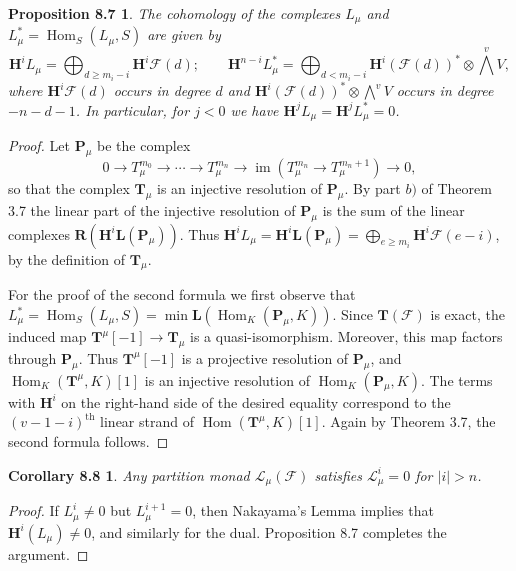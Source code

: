\documentclass{tran-l}
\newcommand{\myim}{\operatorname{im}}
\newcommand{\myHom}{\operatorname{Hom}}
\newcommand{\myth}{{\operatorname{th}}}
\newcommand{\F}{\mathcal{F}}
\newcommand{\myH}{\mathbf{H}}
\newcommand{\LL}{\mathbf{L}}
\newcommand{\myP}{\mathbf{P}}
\newcommand{\RR}{\mathbf{R}}
\newcommand{\TT}{\mathbf{T}}
\theoremstyle{plain}
\newtheorem*{theorem31}{Proposition 8.7}
\newtheorem*{theorem32}{Corollary 8.8}
\theoremstyle{remark}
\theoremstyle{definition}
\begin{document}
\begin{theorem31}
The cohomology of the complexes $L_{\mu }$ and
$L_{\mu }^{*}=\myHom _{S}(L_{\mu }, S)$ are given by
\begin{equation*}\myH ^{i}L_{\mu } = \bigoplus _{d\ge m_{i}-i} \myH ^{i} \F (d); \qquad \myH ^{n-i}L_{\mu }^{*} = 
\bigoplus _{d< m_{i}-i} \myH ^{i} (\F (d))^{*}\otimes \textstyle{\bigwedge ^{v}}V,
\end{equation*}
where $\myH ^{i} \F (d)$ occurs in degree $d$ and 
$\myH ^{i} (\F (d))^{*}\otimes \bigwedge ^{v}V$
occurs in  degree $-n-d-1$. In particular, for $j<0$ we
have $\myH ^{j}L_{\mu }= \myH ^{j}L_{\mu }^{*} = 0$.
\end{theorem31}
\begin{proof}  Let $\myP _{\mu }$ be the complex
\begin{equation*}0\to T_{\mu }^{m_{0}}\to \cdots \to T_{\mu }^{m_{n}}\to \myim (T_{\mu }^{m_{n}}\to T_{\mu }^{m_{n}+1})
\to 0,
\end{equation*}
so that the complex $\TT _{\mu }$ is an injective resolution of $\myP _{\mu }$.
By part $b)$ of Theorem 3.7 the linear part
of the injective
resolution of $\myP _{\mu }$
is the sum of the
linear complexes
$\RR (\myH ^{i}\LL (\myP _{\mu }))$. Thus
$\myH ^{i}L_{\mu }=\myH ^{i}\LL (\myP _{\mu })= \bigoplus _{e\ge m_{i}} \myH
^{i} \F (e-i)$,
by the definition of $\TT _{\mu }$.

For the  proof of the second formula we first observe that
$L_{\mu }^{*}=\myHom _{S}(L_{\mu }, S)=\min \LL (\myHom _{K}(\myP _{\mu },K))$.
Since $\TT (\F )$ is exact, the induced map
$\TT ^{\mu }[-1]\to \TT _{\mu }$ is a quasi-isomorphism.
Moreover, this map factors through $\myP _{\mu }$.
Thus $\TT ^{\mu }[-1]$ is a projective resolution of
$\myP _{\mu }$, and $\myHom _{K}(\TT ^{\mu },K)[1]$ is an
injective resolution of $\myHom _{K}(\myP _{\mu },K)$.
The terms with $\myH ^{i}$ on the right-hand side of the desired equality
correspond to the $(v-1-i)^{\myth }$ linear strand of $\myHom (\TT ^{\mu },K)[1]$.
Again by Theorem 3.7, the second formula follows.\end{proof}
\begin{theorem32}
Any partition monad
$\mathcal{L}_{\mu }(\F )$ satisfies $\mathcal{L}_{\mu }^{i}=0$ for $|i|>n$.
\end{theorem32}
\begin{proof}  If $L_{\mu }^{i}\neq 0$ but $L_{\mu }^{i+1}=0$, then Nakayama's Lemma implies that 
$\myH ^{i}(L_{\mu })\neq 0$, and similarly for the dual. 
Proposition 8.7
completes the argument.\end{proof}
\end{document}

